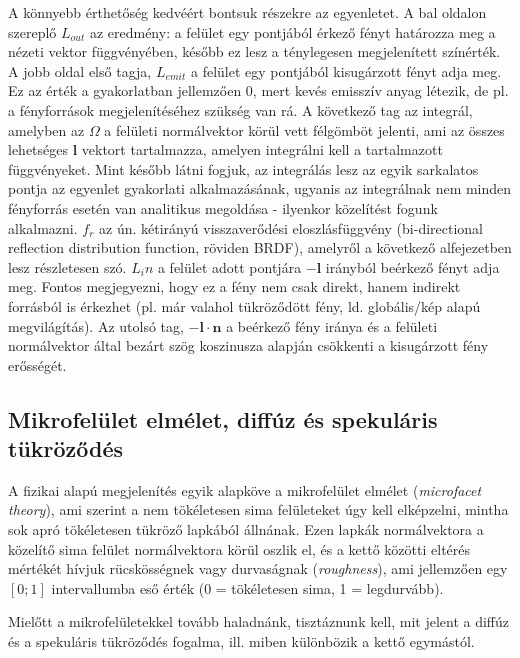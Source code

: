 A könnyebb érthetőség kedvéért bontsuk részekre az egyenletet. A bal oldalon szereplő \(L_{out}\) az eredmény: a felület egy pontjából érkező fényt határozza meg a nézeti vektor függvényében, később ez lesz a ténylegesen megjelenített színérték. A jobb oldal első tagja, \(L_{emit}\) a felület egy pontjából kisugárzott fényt adja meg. Ez az érték a gyakorlatban jellemzően 0, mert kevés emisszív anyag létezik, de pl. a fényforrások megjelenítéséhez szükség van rá. A következő tag az integrál, amelyben az \(\Omega\) a felületi normálvektor körül vett félgömböt jelenti, ami az összes lehetséges \(\mathbf{l}\) vektort tartalmazza, amelyen integrálni kell a tartalmazott függvényeket. Mint később látni fogjuk, az integrálás lesz az egyik sarkalatos pontja az egyenlet gyakorlati alkalmazásának, ugyanis az integrálnak nem minden fényforrás esetén van analitikus megoldása - ilyenkor közelítést fogunk alkalmazni. \(f_r\) az ún. kétirányú visszaverődési eloszlásfüggvény (bi-directional reflection distribution function, röviden BRDF), amelyről a következő alfejezetben lesz részletesen szó. \(L_in\) a felület adott pontjára \(-\mathbf{l}\) irányból beérkező fényt adja meg. Fontos megjegyezni, hogy ez a fény nem csak direkt, hanem indirekt forrásból is érkezhet (pl. már valahol tükröződött fény, ld. globális/kép alapú megvilágítás). Az utolsó tag, \(-\mathbf{l} \cdot \mathbf{n}\) a beérkező fény iránya és a felületi normálvektor által bezárt szög koszinusza alapján csökkenti a kisugárzott fény erősségét.

\subsection{Mikrofelület elmélet, diffúz és spekuláris tükröződés}

A fizikai alapú megjelenítés egyik alapköve a mikrofelület elmélet (\textit{microfacet theory}), ami szerint a nem tökéletesen sima felületeket úgy kell elképzelni, mintha sok apró tökéletesen tükröző lapkából állnának. Ezen lapkák normálvektora a közelítő sima felület normálvektora körül oszlik el, és a kettő közötti eltérés mértékét hívjuk rücskösségnek vagy durvaságnak (\textit{roughness}), ami jellemzően egy \([0; 1]\) intervallumba eső érték (0 = tökéletesen sima, 1 = legdurvább).

Mielőtt a mikrofelületekkel tovább haladnánk, tisztáznunk kell, mit jelent a diffúz és a spekuláris tükröződés fogalma, ill. miben különbözik a kettő egymástól.


